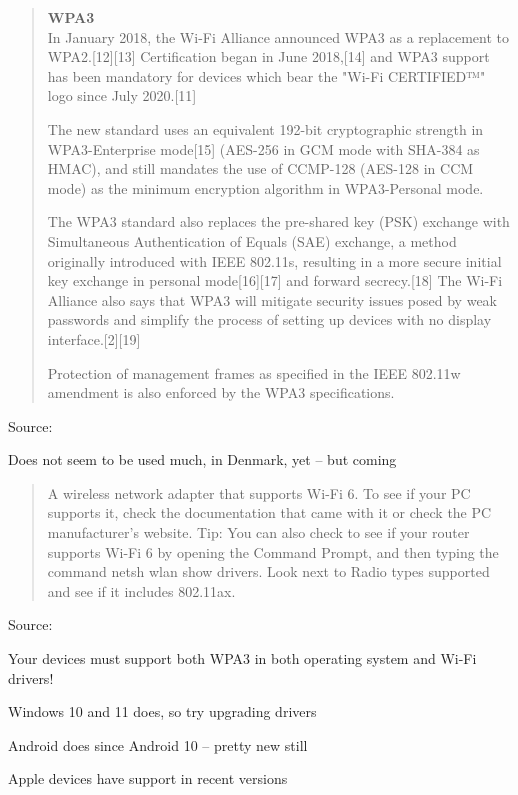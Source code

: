 \documentclass[Screen16to9,17pt]{foils}
\begin{document}
\begin{quote}\small
{\bf WPA3}\\
In January 2018, the Wi-Fi Alliance announced WPA3 as a replacement to WPA2.[12][13] Certification began in June 2018,[14] and WPA3 support has been mandatory for devices which bear the "Wi-Fi CERTIFIED™" logo since July 2020.[11]

The new standard uses an equivalent 192-bit cryptographic strength in WPA3-Enterprise mode[15] (AES-256 in GCM mode with SHA-384 as HMAC), and still mandates the use of CCMP-128 (AES-128 in CCM mode) as the minimum encryption algorithm in WPA3-Personal mode.

The WPA3 standard also replaces the pre-shared key (PSK) exchange with Simultaneous Authentication of Equals (SAE) exchange, a method originally introduced with IEEE 802.11s, resulting in a more secure initial key exchange in personal mode[16][17] and forward secrecy.[18] The Wi-Fi Alliance also says that WPA3 will mitigate security issues posed by weak passwords and simplify the process of setting up devices with no display interface.[2][19]

Protection of management frames as specified in the IEEE 802.11w amendment is also enforced by the WPA3 specifications.
\end{quote}
Source: 

\begin{list2}
\item Does not seem to be used much, in Denmark, yet -- but coming
\end{list2}



\begin{quote}
A wireless network adapter that supports Wi-Fi 6. To see if your PC supports it, check the documentation that came with it or check the PC manufacturer’s website.
Tip: You can also check to see if your router supports Wi-Fi 6 by opening the Command Prompt, and then typing the command netsh wlan show drivers. Look next to Radio types supported and see if it includes 802.11ax.
\end{quote}
Source: 

\begin{list2}
\item Your devices must support both WPA3 in both operating system and Wi-Fi drivers!
\item Windows 10 and 11 does, so try upgrading drivers
\item Android does since Android 10 -- pretty new still
\item Apple devices have support in recent versions
\end{list2}
\end{document}
